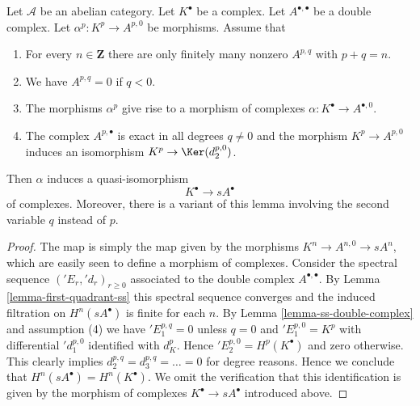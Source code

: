 \begin{lemma}
\label{lemma-double-complex-gives-resolution}
Let $\mathcal{A}$ be an abelian category.
Let $K^\bullet$ be a complex.
Let $A^{\bullet, \bullet}$ be a double complex.
Let $\alpha^p : K^p \to A^{p, 0}$ be morphisms.
Assume that
\begin{enumerate}
\item For every $n \in \mathbf{Z}$ there are only finitely many nonzero
$A^{p, q}$ with $p + q = n$.
\item We have $A^{p, q} = 0$ if $q < 0$.
\item The morphisms $\alpha^p$ give rise to a morphism
of complexes $\alpha : K^\bullet \to A^{\bullet, 0}$.
\item The complex $A^{p, \bullet}$ is exact in all degrees
$q \not = 0$ and the morphism $K^p \to A^{p, 0}$ induces
an isomorphism $K^p \to \Ker(d_2^{p, 0})$.
\end{enumerate}
Then $\alpha$ induces a quasi-isomorphism
$$
K^\bullet \longrightarrow sA^\bullet
$$
of complexes.
Moreover, there is a variant of this lemma involving the second
variable $q$ instead of $p$.
\end{lemma}

\begin{proof}
The map is simply the map given by the morphisms
$K^n \to A^{n, 0} \to sA^n$, which are easily seen to define
a morphism of complexes.
Consider the spectral sequence $({}'E_r, {}'d_r)_{r \geq 0}$
associated to the double complex $A^{\bullet, \bullet}$.
By Lemma \ref{lemma-first-quadrant-ss} this spectral sequence converges
and the induced filtration on $H^n(sA^\bullet)$ is finite for each $n$.
By Lemma \ref{lemma-ss-double-complex} and assumption (4) we have
${}'E_1^{p, q} = 0$ unless $q = 0$ and $'E_1^{p, 0} = K^p$
with differential ${}'d_1^{p, 0}$ identified with $d_K^p$.
Hence ${}'E_2^{p, 0} = H^p(K^\bullet)$ and zero otherwise.
This clearly implies $d_2^{p, q} = d_3^{p, q} = \ldots = 0$
for degree reasons. Hence we conclude that $H^n(sA^\bullet) = H^n(K^\bullet)$.
We omit the verification that this identification is given by the
morphism of complexes $K^\bullet \to sA^\bullet$ introduced above.
\end{proof}

